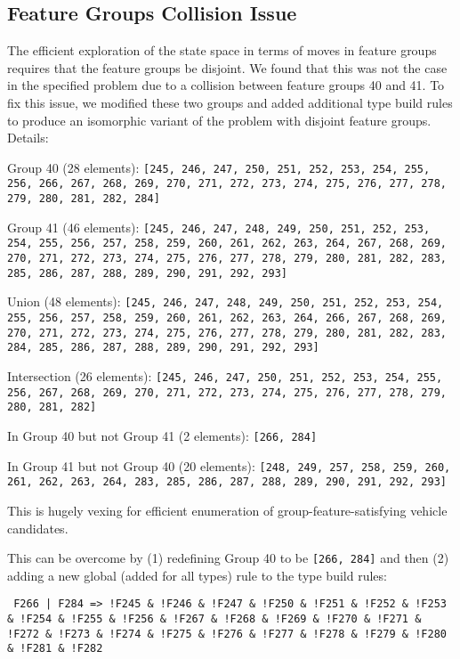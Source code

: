 \documentclass[aps,prl,twocolumn,superscriptaddress,groupedaddress]{revtex4}  %
\begin{document}
\subsection{Feature Groups Collision Issue}

The efficient exploration of the state space in terms of moves in feature groups
requires that the feature groups be disjoint. We found that this was not the
case in the specified problem due to a collision between feature groups 40 and
41. To fix this issue, we modified these two groups and added additional type
build rules to produce an isomorphic variant of the problem with disjoint
feature groups. Details:

Group 40 (28 elements): \texttt{[245, 246, 247, 250, 251, 252, 253, 254, 255,
256, 266, 267, 268, 269, 270, 271, 272, 273, 274, 275, 276, 277, 278, 279, 280,
281, 282, 284]}

Group 41 (46 elements): \texttt{[245, 246, 247, 248, 249, 250, 251, 252, 253,
254, 255, 256, 257, 258, 259, 260, 261, 262, 263, 264, 267, 268, 269, 270, 271,
272, 273, 274, 275, 276, 277, 278, 279, 280, 281, 282, 283, 285, 286, 287, 288,
289, 290, 291, 292, 293]}

Union (48 elements): \texttt{[245, 246, 247, 248, 249, 250, 251, 252, 253, 254,
255, 256, 257, 258, 259, 260, 261, 262, 263, 264, 266, 267, 268, 269, 270, 271,
272, 273, 274, 275, 276, 277, 278, 279, 280, 281, 282, 283, 284, 285, 286, 287,
288, 289, 290, 291, 292, 293]}

Intersection (26 elements): \texttt{[245, 246, 247, 250, 251, 252, 253, 254,
255, 256, 267, 268, 269, 270, 271, 272, 273, 274, 275, 276, 277, 278, 279, 280,
281, 282]}

In Group 40 but not Group 41 (2 elements): \texttt{[266, 284]}

In Group 41 but not Group 40 (20 elements): \texttt{[248, 249, 257, 258, 259,
260, 261, 262, 263, 264, 283, 285, 286, 287, 288, 289, 290, 291, 292, 293]}

This is hugely vexing for efficient enumeration of group-feature-satisfying
vehicle candidates.

This can be overcome by (1) redefining Group 40 to be \texttt{[266, 284]} and
then (2) adding a new global (added for all types) rule to the type build rules:

\texttt{ F266 | F284 => !F245 \& !F246 \& !F247 \& !F250 \& !F251 \& !F252 \& !F253 \&
!F254 \& !F255 \& !F256 \& !F267 \& !F268 \& !F269 \& !F270 \& !F271 \& !F272 \& !F273 \&
!F274 \& !F275 \& !F276 \& !F277 \& !F278 \& !F279 \& !F280 \& !F281 \& !F282}
\end{document}
